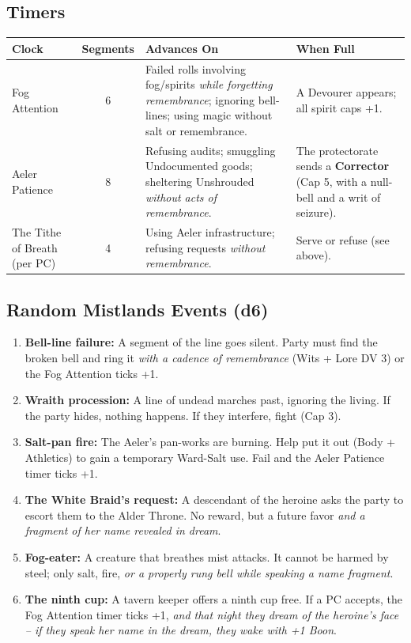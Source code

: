 \documentclass[12pt]{article}
\begin{document}
\subsection{Timers}
\begin{table}[h]
  \centering
  \begin{tabular}{|l|c|l|l|}
    \hline
    \textbf{Clock} & \textbf{Segments} & \textbf{Advances On} & \textbf{When Full} \\
    \hline
    Fog Attention & 6 & Failed rolls involving fog/spirits \textit{while forgetting remembrance}; ignoring bell-lines; using magic without salt or remembrance. & A Devourer appears; all spirit caps +1. \\
    \hline
    Aeler Patience & 8 & Refusing audits; smuggling Undocumented goods; sheltering Unshrouded \textit{without acts of remembrance}. & The protectorate sends a \textbf{Corrector} (Cap 5, with a null-bell and a writ of seizure). \\
    \hline
    The Tithe of Breath (per PC) & 4 & Using Aeler infrastructure; refusing requests \textit{without remembrance}. & Serve or refuse (see above). \\
    \hline
  \end{tabular}
\end{table}

\subsection{Random Mistlands Events (d6)}
\begin{enumerate}[label=\arabic*.]
  \item \textbf{Bell-line failure:} A segment of the line goes silent. Party must find the broken bell and ring it \textit{with a cadence of remembrance} (Wits + Lore DV 3) or the Fog Attention ticks +1.
  \item \textbf{Wraith procession:} A line of undead marches past, ignoring the living. If the party hides, nothing happens. If they interfere, fight (Cap 3).
  \item \textbf{Salt-pan fire:} The Aeler's pan-works are burning. Help put it out (Body + Athletics) to gain a temporary Ward-Salt use. Fail and the Aeler Patience timer ticks +1.
  \item \textbf{The White Braid's request:} A descendant of the heroine asks the party to escort them to the Alder Throne. No reward, but a future favor \textit{and a fragment of her name revealed in dream}.
  \item \textbf{Fog-eater:} A creature that breathes mist attacks. It cannot be harmed by steel; only salt, fire, \textit{or a properly rung bell while speaking a name fragment}.
  \item \textbf{The ninth cup:} A tavern keeper offers a ninth cup free. If a PC accepts, the Fog Attention timer ticks +1, \textit{and that night they dream of the heroine's face -- if they speak her name in the dream, they wake with +1 Boon}.
\end{enumerate}
\end{document}
